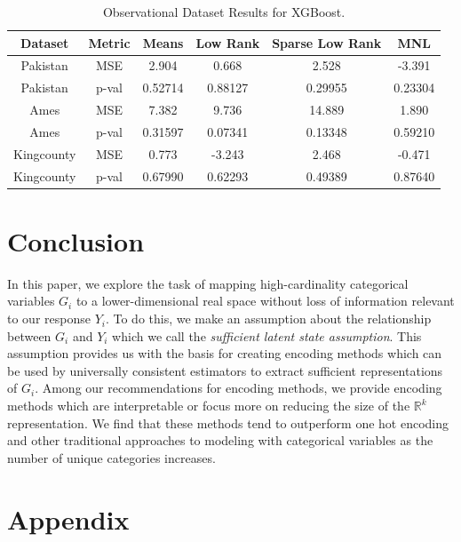 \documentclass{article}
\theoremstyle{plain}
\theoremstyle{definition}
\theoremstyle{remark}
\begin{document}
\begin{table}[H]
	\centering
	\begin{tabular}{|c|c|c|c|c|c|}
		\hline
		Dataset& Metric & Means & Low Rank & Sparse Low Rank & MNL  \\
		\hline
		Pakistan & MSE & 2.904 &0.668 & 2.528&-3.391\\
		Pakistan & p-val&0.52714  &0.88127 &0.29955 &0.23304 \\
		\hline
		Ames & MSE & 7.382 & 9.736& 14.889& 1.890\\
		Ames & p-val& 0.31597&0.07341 & 0.13348& 0.59210\\
		\hline
		Kingcounty & MSE & 0.773& -3.243&2.468 & -0.471\\
		Kingcounty & p-val&0.67990&0.62293&0.49389& 0.87640\\
		\hline
	\end{tabular}
	\caption{Observational Dataset Results for XGBoost.}
	\label{tab:observational_xgb}
\end{table}



\section{Conclusion}

In this paper, we explore the task of mapping high-cardinality categorical variables $G_i$ to a lower-dimensional real space without loss of information relevant to our response $Y_i$. To do this, we make an assumption about the relationship between $G_i$ and $Y_i$ which we call the \textit{sufficient latent state assumption}. This assumption provides us with the basis for creating encoding methods which can be used by universally consistent estimators to extract sufficient representations of $G_i$. Among our recommendations for encoding methods, we provide encoding methods which are interpretable or focus more on reducing the size of the  $\mathbb{R}^k$ representation. We find that these methods tend to outperform one hot encoding and other traditional approaches to modeling with categorical variables as the number of unique categories  increases.









\clearpage
\section{Appendix}
\setlength{\parindent}{0pt}
\end{document}
